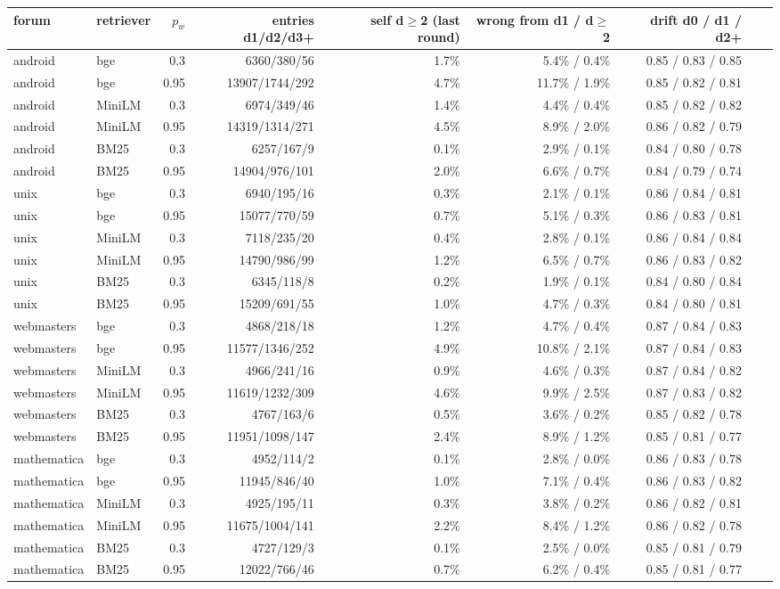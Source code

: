 \begin{tabular}{llrrrrrrr}
\toprule
forum & retriever & $p_w$ & entries d1/d2/d3+ & self d$\geq$2 (last round) & wrong from d1 / d$\geq$2 & drift d0 / d1 / d2+ \\
\midrule
android & bge & 0.3 & 6360/380/56 & 1.7\% & 5.4\% / 0.4\% & 0.85 / 0.83 / 0.85 \\
android & bge & 0.95 & 13907/1744/292 & 4.7\% & 11.7\% / 1.9\% & 0.85 / 0.82 / 0.81 \\
android & MiniLM & 0.3 & 6974/349/46 & 1.4\% & 4.4\% / 0.4\% & 0.85 / 0.82 / 0.82 \\
android & MiniLM & 0.95 & 14319/1314/271 & 4.5\% & 8.9\% / 2.0\% & 0.86 / 0.82 / 0.79 \\
android & BM25 & 0.3 & 6257/167/9 & 0.1\% & 2.9\% / 0.1\% & 0.84 / 0.80 / 0.78 \\
android & BM25 & 0.95 & 14904/976/101 & 2.0\% & 6.6\% / 0.7\% & 0.84 / 0.79 / 0.74 \\
unix & bge & 0.3 & 6940/195/16 & 0.3\% & 2.1\% / 0.1\% & 0.86 / 0.84 / 0.81 \\
unix & bge & 0.95 & 15077/770/59 & 0.7\% & 5.1\% / 0.3\% & 0.86 / 0.83 / 0.81 \\
unix & MiniLM & 0.3 & 7118/235/20 & 0.4\% & 2.8\% / 0.1\% & 0.86 / 0.84 / 0.84 \\
unix & MiniLM & 0.95 & 14790/986/99 & 1.2\% & 6.5\% / 0.7\% & 0.86 / 0.83 / 0.82 \\
unix & BM25 & 0.3 & 6345/118/8 & 0.2\% & 1.9\% / 0.1\% & 0.84 / 0.80 / 0.84 \\
unix & BM25 & 0.95 & 15209/691/55 & 1.0\% & 4.7\% / 0.3\% & 0.84 / 0.80 / 0.81 \\
webmasters & bge & 0.3 & 4868/218/18 & 1.2\% & 4.7\% / 0.4\% & 0.87 / 0.84 / 0.83 \\
webmasters & bge & 0.95 & 11577/1346/252 & 4.9\% & 10.8\% / 2.1\% & 0.87 / 0.84 / 0.83 \\
webmasters & MiniLM & 0.3 & 4966/241/16 & 0.9\% & 4.6\% / 0.3\% & 0.87 / 0.84 / 0.82 \\
webmasters & MiniLM & 0.95 & 11619/1232/309 & 4.6\% & 9.9\% / 2.5\% & 0.87 / 0.83 / 0.82 \\
webmasters & BM25 & 0.3 & 4767/163/6 & 0.5\% & 3.6\% / 0.2\% & 0.85 / 0.82 / 0.78 \\
webmasters & BM25 & 0.95 & 11951/1098/147 & 2.4\% & 8.9\% / 1.2\% & 0.85 / 0.81 / 0.77 \\
mathematica & bge & 0.3 & 4952/114/2 & 0.1\% & 2.8\% / 0.0\% & 0.86 / 0.83 / 0.78 \\
mathematica & bge & 0.95 & 11945/846/40 & 1.0\% & 7.1\% / 0.4\% & 0.86 / 0.83 / 0.82 \\
mathematica & MiniLM & 0.3 & 4925/195/11 & 0.3\% & 3.8\% / 0.2\% & 0.86 / 0.82 / 0.81 \\
mathematica & MiniLM & 0.95 & 11675/1004/141 & 2.2\% & 8.4\% / 1.2\% & 0.86 / 0.82 / 0.78 \\
mathematica & BM25 & 0.3 & 4727/129/3 & 0.1\% & 2.5\% / 0.0\% & 0.85 / 0.81 / 0.79 \\
mathematica & BM25 & 0.95 & 12022/766/46 & 0.7\% & 6.2\% / 0.4\% & 0.85 / 0.81 / 0.77 \\
\bottomrule
\end{tabular}
